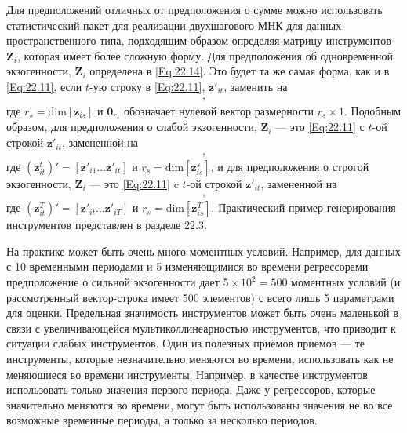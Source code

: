 Для предположений отличных от предположения о сумме можно использовать статистический пакет для реализации двухшагового МНК для данных пространственного типа, подходящим образом определяя матрицу инструментов $\mathbf Z_i$, которая имеет более сложную форму. Для  предположения об  одновременной экзогенности, $\mathbf Z_i$ определена в \ref{Eq:22.14}. Это будет та же самая форма, как и в \ref{Eq:22.11}, если $t$-ую строку в \ref{Eq:22.11}, $\mathbf z'_{it}$, заменить на 
\begin{align}
[\mathbf 0'_{r_1} \dots \mathbf 0'_{r_{t-1}} \mathbf z'_{it} \mathbf 0'_{r_{t+1}} \dots \mathbf 0'_{r_{T}}],
\label{Eq:22.17}
\end{align}
где $r_s=\mathrm{dim}[\mathbf z_{is}]$ и $\mathbf 0_{r_s}$ обозначает нулевой вектор размерности $r_s \times 1$. Подобным образом, для предположения о слабой экзогенности, $\mathbf Z_i$  --- это \ref{Eq:22.11} с $t$-ой строкой $\mathbf z'_{it}$, замененной на
\begin{align}
[\mathbf 0'_{r_1} \dots \mathbf 0'_{r_{t-1}} (\mathbf z^t_{it})' \mathbf 0'_{r_{t+1}} \dots \mathbf 0'_{r_{T}}],
\label{Eq:22.18}
\end{align}
где $(\mathbf z^t_{it})'=[\mathbf z'_{i1} \dots \mathbf z'_{it}]$ и $r_s=\mathrm{dim}[\mathbf z^s_{is}]$, и для предположения о строгой экзогенности, $\mathbf Z_i$ --- это \ref{Eq:22.11} c $t$-ой строкой $\mathbf z'_{it}$, замененной на
\begin{align}
[\mathbf 0'_{r_1} \dots \mathbf 0'_{r_{t-1}} (\mathbf z^T_{it})' \mathbf 0'_{r_{t+1}} \dots \mathbf 0'_{r_{T}}],
\label{Eq:22.19}
\end{align}
где $(\mathbf z^T_{it})'=[\mathbf z'_{it} \dots \mathbf z'_{iT}]$ и $r_s=\mathrm{dim}[\mathbf z^T_{is}]$. Практический пример генерирования инструментов представлен в разделе 22.3.

На практике может быть очень много моментных условий. Например, для данных с 10 временными периодами и 5 изменяющимися во времени регрессорами предположение о сильной экзогенности дает $5 \times 10^2=500$ моментных условий (и рассмотренный вектор-строка имеет 500 элементов) с всего лишь 5 параметрами для оценки. Предельная значимость инструментов может быть очень маленькой в связи с увеличивающейся мультиколлинеарностью инструментов, что приводит к ситуации слабых инструментов. Один из полезных приёмов приемов --- те инструменты, которые незначительно меняются во времени, использовать как не меняющиеся во времени инструменты. Например, в качестве инструментов использовать только значения первого периода. Даже у регрессоров, которые значительно меняются во времени, могут быть использованы значения не во все возможные временные периоды, а только за несколько периодов.

